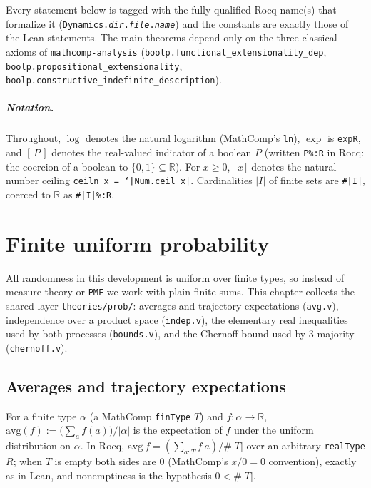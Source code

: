 Every statement below is tagged with the fully qualified Rocq name(s) that
formalize it (\texttt{Dynamics.\textit{dir}.\textit{file}.\textit{name}}) and
the constants are exactly those of the Lean statements. The main theorems
depend only on the three classical axioms of \texttt{mathcomp-analysis}
(\texttt{boolp.functional\_extensionality\_dep},
\texttt{boolp.propositional\_extensionality},
\texttt{boolp.constructive\_indefinite\_description}).

\paragraph{Notation.} Throughout, $\log$ denotes the natural logarithm
(MathComp's \texttt{ln}), $\exp$ is \texttt{expR}, and $[\,P\,]$ denotes the
real-valued indicator of a boolean $P$ (written \texttt{P\%:R} in Rocq: the
coercion of a boolean to $\{0,1\} \subseteq \mathbb{R}$). For $x \ge 0$,
$\lceil x \rceil$ denotes the natural-number ceiling
\texttt{ceiln x = `|Num.ceil x|}. Cardinalities $|I|$ of finite sets are
\texttt{\#|I|}, coerced to $\mathbb{R}$ as \texttt{\#|I|\%:R}.

\chapter{Finite uniform probability}\label{pr:chapter}

All randomness in this development is uniform over finite types, so instead
of measure theory or \texttt{PMF} we work with plain finite sums. This
chapter collects the shared layer \texttt{theories/prob/}: averages and
trajectory expectations (\texttt{avg.v}), independence over a product space
(\texttt{indep.v}), the elementary real inequalities used by both processes
(\texttt{bounds.v}), and the Chernoff bound used by 3-majority
(\texttt{chernoff.v}).

\section{Averages and trajectory expectations}\label{pr:sec:avg}

\begin{definition}[Average]\label{pr:avg}
  \rocqok
  For a finite type $\alpha$ (a MathComp \texttt{finType} $T$) and
  $f \colon \alpha \to \mathbb{R}$,
  $\mathrm{avg}(f) := \bigl(\sum_{a} f(a)\bigr) / |\alpha|$ is the
  expectation of $f$ under the uniform distribution on $\alpha$.
  In Rocq, $\mathrm{avg}\ f = (\sum_{a : T} f\ a) / \#|T|$ over an arbitrary
  \texttt{realType} $R$; when $T$ is empty both sides are $0$ (MathComp's
  $x / 0 = 0$ convention), exactly as in Lean, and nonemptiness is the
  hypothesis $0 < \#|T|$.
\end{definition}

